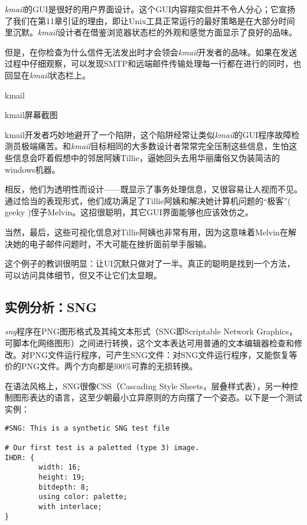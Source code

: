 \documentclass[12pt,oneside]{book}
\begin{document}
\begin{common-format}
\textit{kmail}的GUI是很好的用户界面设计。这个GUI内容翔实但并不令人分心；它宣扬了我们在第11章引证的理由，即让Unix工具正常运行的最好策略是在大部分时间里沉默。\textit{kmail}设计者在借鉴浏览器状态栏的外观和感觉方面显示了良好的品味。

但是，在你检查为什么信件无法发出时才会领会\textit{kmail}开发者的品味。如果在发送过程中仔细观察，可以发现SMTP和远端邮件传输处理每一行都在进行的同时，也回显在\textit{kmail}状态栏上。

\begin{linefig}{kmail}
\caption{kmail屏幕截图}
\label{fig:kmail}
\end{linefig}

kmail开发者巧妙地避开了一个陷阱，这个陷阱经常让类似\textit{kmail}的GUI程序故障检测员极端痛苦。和\textit{kmail}目标相同的大多数设计者常常完全压制这些信息，生怕这些信息会吓着假想中的邻居阿姨Tillie，逼她回头去用华丽庸俗又伪装简洁的windows机器。

相反，他们为透明性而设计——既显示了事务处理信息，又很容易让人视而不见。通过恰当的表现形式，他们成功满足了Tillie阿姨和解决她计算机问题的“极客”( geeky )侄子Melvin。这招很聪明，其它GUI界面能够也应该效仿之。

当然，最后，这些可视化信息对Tillie阿姨也非常有用，因为这意味着Melvin在解决她的电子邮件问题时，不大可能在挫折面前举手服输。

这个例子的教训很明显：让UI沉默只做对了一半。真正的聪明是找到一个方法，可以访问具体细节，但又不让它们太显眼。



\subsection{实例分析：SNG}
\textit{sng}程序在PNG图形格式及其纯文本形式（SNG即Scriptable Network Graphics，可脚本化网络图形）之间进行转换，这个文本表达可用普通的文本编辑器检查和修改。对PNG文件运行程序，可产生SNG文件：对SNG文件运行程序，又能恢复等价的PNG文件。两个方向都是l00\%{}可靠的无损转换。

在语法风格上，SNG很像CSS（Cascading Style Sheets，层叠样式表），另一种控制图形表达的语言，这至少朝最小立异原则的方向摆了一个姿态。以下是一个测试实例：

\begin{Verbatim}[label=例6.2  SNG实例]
#SNG: This is a synthetic SNG test file

# Our first test is a paletted (type 3) image.
IHDR: {
        width: 16;
        height: 19;
        bitdepth: 8;
        using color: palette; 
        with interlace;
}


\end{Verbatim}
\end{common-format}
\end{document}

